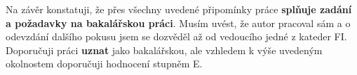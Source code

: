 Na závěr konstatuji, že přes všechny uvedené připomínky práce \textbf{splňuje
zadání a požadavky na bakalářskou práci}. Musím uvést, že autor pracoval sám a
o odevzdání dalšího pokusu jsem se dozvěděl až od vedoucího jedné z kateder
FI. Doporučuji práci \textbf{uznat} jako bakalářskou, ale vzhledem k výše
uvedeným okolnostem doporučuji hodnocení stupněm E.

\botinfo

